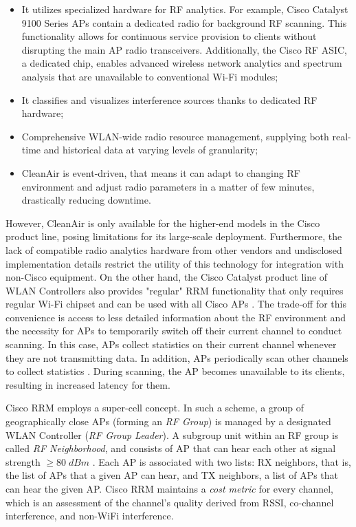 \begin{itemize}
    \item It utilizes specialized hardware for RF analytics. For example, Cisco Catalyst 9100 Series APs contain a dedicated radio for background RF scanning. This functionality allows for continuous service provision to clients without disrupting the main AP radio transceivers. Additionally, the Cisco RF ASIC, a dedicated chip, enables advanced wireless network analytics and spectrum analysis that are unavailable to conventional Wi-Fi modules;
    \item It classifies and visualizes interference sources thanks to dedicated RF hardware;
    \item Comprehensive WLAN-wide radio resource management, supplying both real-time and historical data at varying levels of granularity;
    \item CleanAir is event-driven, that means it can adapt to changing RF environment and adjust radio parameters in a matter of few minutes, drastically reducing downtime.
\end{itemize}
However, CleanAir is only available for the higher-end models in the Cisco product line, posing limitations for its large-scale deployment. Furthermore, the lack of compatible radio analytics hardware from other vendors and undisclosed implementation details restrict the utility of this technology for integration with non-Cisco equipment.
On the other hand, the Cisco Catalyst product line of WLAN Controllers also provides "regular" RRM functionality that only requires regular Wi-Fi chipset and can be used with all Cisco APs \cite{ciscoRadioResourceManagement}. The trade-off for this convenience is access to less detailed information about the RF environment and the necessity for APs to temporarily switch off their current channel to conduct scanning. In this case, APs collect statistics on their current channel whenever they are not transmitting data. In addition, APs periodically scan other channels to collect statistics \cite{arenaUnderstandingTroubleshootingCisco2022}. During scanning, the AP becomes unavailable to its clients, resulting in increased latency for them.

Cisco RRM employs a super-cell concept. In such a scheme, a group of geographically close APs (forming an \textit{RF Group}) is managed by a designated WLAN Controller (\textit{RF Group Leader}).
A subgroup unit within an RF group is called \textit{RF Neighborhood}, and consists of AP that can hear each other at signal strength $\geq 80 \; dBm$ \cite{arenaUnderstandingTroubleshootingCisco2022}. Each AP is associated with two lists: RX neighbors, that is, the list of APs that a given AP can hear, and TX neighbors, a list of APs that can hear the given AP. Cisco RRM maintains a \textit{ cost metric} for every channel, which is an assessment of the channel's quality derived from RSSI, co-channel interference, and non-WiFi interference.


